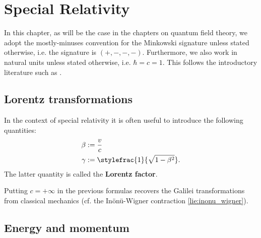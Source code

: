 \chapter{Special Relativity}

    In this chapter, as will be the case in the chapters on quantum field theory, we adopt the mostly-minuses convention for the Minkowski signature unless stated otherwise, i.e. the signature is $(+,-,-,-)$. Furthermore, we also work in natural units unless stated otherwise, i.e. $\hbar = c = 1$. This follows the introductory literature such as \cite{Peskin, greiner_qft}.

\section{Lorentz transformations}

    \begin{notation}
        In the context of special relativity it is often useful to introduce the following quantities:
        \begin{align}
            \beta &:= \frac{v}{c}\\
            \label{rel:lorentz_factor}
            \gamma &:= \stylefrac{1}{\sqrt{1 - \beta^2}}.
        \end{align}
        The latter quantity is called the \textbf{Lorentz factor}.
    \end{notation}
    \begin{remark}
        Putting $c=+\infty$ in the previous formulas recovers the Galilei transformations from classical mechanics (cf. the In\"on\"u-Wigner contraction \ref{lie:inonu_wigner}).
    \end{remark}

\section{Energy and momentum}


